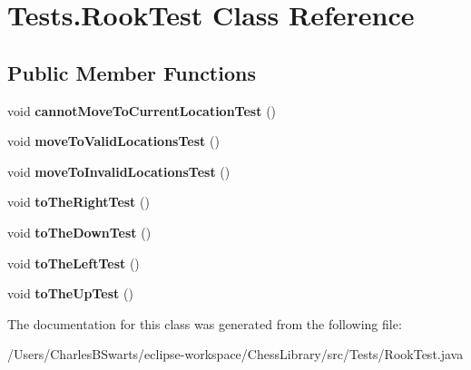 \hypertarget{class_tests_1_1_rook_test}{}\section{Tests.\+Rook\+Test Class Reference}
\label{class_tests_1_1_rook_test}
\subsection*{Public Member Functions}
\begin{DoxyCompactItemize}
\item 
\mbox{\label{class_tests_1_1_rook_test_a81223434aac0b2ae7c8a45041a701b7f}} 
void {\bfseries cannot\+Move\+To\+Current\+Location\+Test} ()
\item 
\mbox{\label{class_tests_1_1_rook_test_a347f9ed2821b93a0b28dcded9803d4df}} 
void {\bfseries move\+To\+Valid\+Locations\+Test} ()
\item 
\mbox{\label{class_tests_1_1_rook_test_a82cc6ff5beffa18e5f6555704773e1ad}} 
void {\bfseries move\+To\+Invalid\+Locations\+Test} ()
\item 
\mbox{\label{class_tests_1_1_rook_test_acbb43811e924babb29a1697a438998ee}} 
void {\bfseries to\+The\+Right\+Test} ()
\item 
\mbox{\label{class_tests_1_1_rook_test_a4ce3e69a80220546f2ddb23ba5eb3e16}} 
void {\bfseries to\+The\+Down\+Test} ()
\item 
\mbox{\label{class_tests_1_1_rook_test_aa316d7576f1da7c726967f4f8b6c9a1e}} 
void {\bfseries to\+The\+Left\+Test} ()
\item 
\mbox{\label{class_tests_1_1_rook_test_af7adbb22657b686c40e2eccfe2c947c5}} 
void {\bfseries to\+The\+Up\+Test} ()
\end{DoxyCompactItemize}


The documentation for this class was generated from the following file\+:\begin{DoxyCompactItemize}
\item 
/\+Users/\+Charles\+B\+Swarts/eclipse-\/workspace/\+Chess\+Library/src/\+Tests/Rook\+Test.\+java\end{DoxyCompactItemize}
